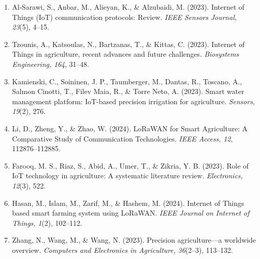 \documentclass[12pt,a4paper]{article}
\begin{document}
\begin{enumerate}
    \item Al-Sarawi, S., Anbar, M., Alieyan, K., \& Alzubaidi, M. (2023). Internet of Things (IoT) communication protocols: Review. \textit{IEEE Sensors Journal, 23}(5), 4–15.
    
    \item Tzounis, A., Katsoulas, N., Bartzanas, T., \& Kittas, C. (2023). Internet of Things in agriculture, recent advances and future challenges. \textit{Biosystems Engineering, 164}, 31–48.
    
    \item Kamienski, C., Soininen, J. P., Taumberger, M., Dantas, R., Toscano, A., Salmon Cinotti, T., Filev Maia, R., \& Torre Neto, A. (2023). Smart water management platform: IoT-based precision irrigation for agriculture. \textit{Sensors, 19}(2), 276.
    
    \item Li, D., Zheng, Y., \& Zhao, W. (2024). LoRaWAN for Smart Agriculture: A Comparative Study of Communication Technologies. \textit{IEEE Access, 12}, 112876–112885.
    
    \item Farooq, M. S., Riaz, S., Abid, A., Umer, T., \& Zikria, Y. B. (2023). Role of IoT technology in agriculture: A systematic literature review. \textit{Electronics, 12}(3), 522.
    
    \item Hasan, M., Islam, M., Zarif, M., \& Hashem, M. (2024). Internet of Things based smart farming system using LoRaWAN. \textit{IEEE Journal on Internet of Things, 1}(2), 102–112.
    
    \item Zhang, N., Wang, M., \& Wang, N. (2023). Precision agriculture—a worldwide overview. \textit{Computers and Electronics in Agriculture, 36}(2–3), 113–132.
\end{enumerate}
\end{document}
